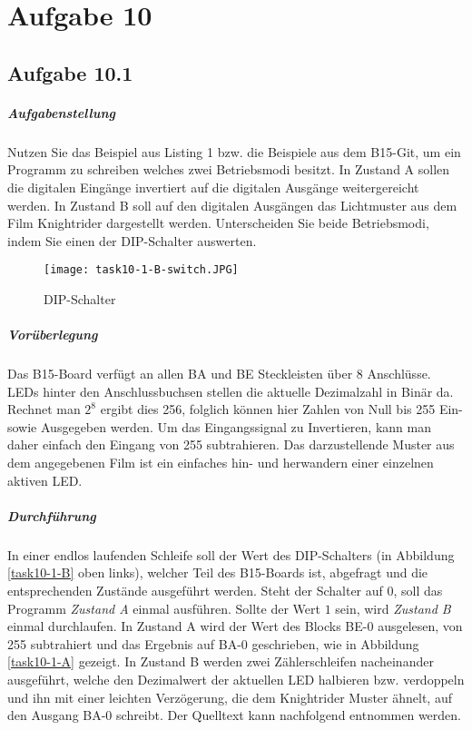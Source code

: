 \chapter{Aufgabe 10}
\section{Aufgabe 10.1}

\paragraph{Aufgabenstellung}
Nutzen Sie das Beispiel aus Listing 1 bzw. die Beispiele aus dem B15-Git, um ein Programm zu schreiben welches zwei Betriebsmodi besitzt. In Zustand A sollen die digitalen Eingänge invertiert auf die digitalen Ausgänge weitergereicht werden. In Zustand B soll auf den digitalen Ausgängen das Lichtmuster aus dem Film Knightrider dargestellt werden. Unterscheiden Sie beide Betriebsmodi, indem Sie einen der DIP-Schalter auswerten.

\begin{wrapfigure}[20]{r}{.3\textwidth}
	\texttt{[image: task10-1-B-switch.JPG]}
	\caption{DIP-Schalter}
	\label{task10-1-B}
\end{wrapfigure}

\paragraph{Vorüberlegung}
Das B15-Board verfügt an allen BA und BE Steckleisten über 8 Anschlüsse. LEDs hinter den Anschlussbuchsen stellen die aktuelle Dezimalzahl in Binär da. Rechnet man $2^8$ ergibt dies 256, folglich können hier Zahlen von Null bis 255 Ein- sowie Ausgegeben werden. Um das Eingangssignal zu Invertieren, kann man daher einfach den Eingang von 255 subtrahieren. Das darzustellende Muster aus dem angegebenen Film ist ein einfaches hin- und herwandern einer einzelnen aktiven LED.

\paragraph{Durchführung}
In einer endlos laufenden Schleife soll der Wert des DIP-Schalters (in Abbildung \vref{task10-1-B} oben links), welcher Teil des B15-Boards ist, abgefragt und die entsprechenden Zustände ausgeführt werden. Steht der Schalter auf $0$, soll das Programm \textit{Zustand A} einmal ausführen. Sollte der Wert $1$ sein, wird \textit{Zustand B} einmal durchlaufen. In Zustand A wird der Wert des Blocks BE-0 ausgelesen, von 255 subtrahiert und das Ergebnis auf BA-0 geschrieben, wie in Abbildung \vref{task10-1-A} gezeigt. In Zustand B werden zwei Zählerschleifen nacheinander ausgeführt, welche den Dezimalwert der aktuellen LED halbieren bzw. verdoppeln und ihn mit einer leichten Verzögerung, die dem Knightrider Muster ähnelt, auf den Ausgang BA-0 schreibt. Der Quelltext kann nachfolgend entnommen werden.

